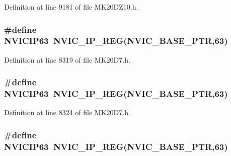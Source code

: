 Definition at line 9181 of file M\+K20\+D\+Z10.\+h.

\subsubsection[{\texorpdfstring{N\+V\+I\+C\+I\+P63}{NVICIP63}}]{\setlength{\rightskip}{0pt plus 5cm}\#define N\+V\+I\+C\+I\+P63~{\bf N\+V\+I\+C\+\_\+\+I\+P\+\_\+\+R\+EG}({\bf N\+V\+I\+C\+\_\+\+B\+A\+S\+E\+\_\+\+P\+TR},63)}\hypertarget{group___n_v_i_c___register___accessor___macros_gaaa436fa15fd11e090bda293d59a1c536}{}\label{group___n_v_i_c___register___accessor___macros_gaaa436fa15fd11e090bda293d59a1c536}


Definition at line 8319 of file M\+K20\+D7.\+h.

\subsubsection[{\texorpdfstring{N\+V\+I\+C\+I\+P63}{NVICIP63}}]{\setlength{\rightskip}{0pt plus 5cm}\#define N\+V\+I\+C\+I\+P63~{\bf N\+V\+I\+C\+\_\+\+I\+P\+\_\+\+R\+EG}({\bf N\+V\+I\+C\+\_\+\+B\+A\+S\+E\+\_\+\+P\+TR},63)}\hypertarget{group___n_v_i_c___register___accessor___macros_gaaa436fa15fd11e090bda293d59a1c536}{}\label{group___n_v_i_c___register___accessor___macros_gaaa436fa15fd11e090bda293d59a1c536}


Definition at line 8324 of file M\+K20\+D7.\+h.

\subsubsection[{\texorpdfstring{N\+V\+I\+C\+I\+P63}{NVICIP63}}]{\setlength{\rightskip}{0pt plus 5cm}\#define N\+V\+I\+C\+I\+P63~{\bf N\+V\+I\+C\+\_\+\+I\+P\+\_\+\+R\+EG}({\bf N\+V\+I\+C\+\_\+\+B\+A\+S\+E\+\_\+\+P\+TR},63)}\hypertarget{group___n_v_i_c___register___accessor___macros_gaaa436fa15fd11e090bda293d59a1c536}{}\label{group___n_v_i_c___register___accessor___macros_gaaa436fa15fd11e090bda293d59a1c536}


